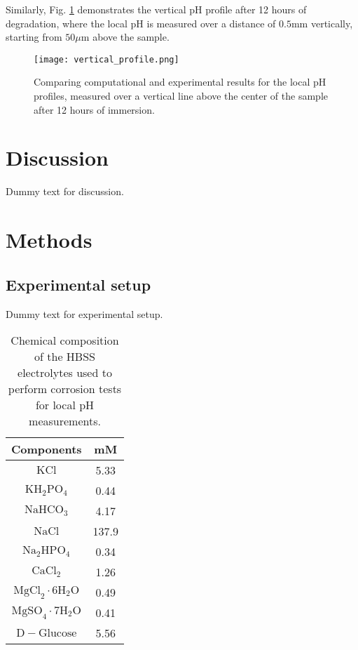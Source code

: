 Similarly, Fig. \ref{fig:kinetics_vertical_profile} demonstrates the vertical pH profile after 12 hours of degradation, where the local pH is measured over a distance of $0.5 \mathrm{mm}$ vertically, starting from $50 \mu\mathrm{m}$ above the sample.

\begin{figure}[h]
\centering
\medskip
\texttt{[image: vertical\_profile.png]}
\caption[Comparing computational and experimental vertical pH profiles]{Comparing computational and experimental results for the local pH profiles, measured over a vertical line above the center of the sample after 12 hours of immersion.} \label{fig:kinetics_vertical_profile}
\end{figure}

\section{Discussion}

Dummy text for discussion.

\section{Methods}

\subsection{Experimental setup}

Dummy text for experimental setup.

\begin{table}[h]
\caption[Chemical composition of the HBSS electrolyte]{Chemical composition of the HBSS electrolytes used to perform corrosion tests for local pH measurements.}
\medskip
\centering
\begin{tabular}{cc}
\hline
{Components} & {mM} \\
\hline
$\mathrm{KCl}$ & 5.33 \\
$\mathrm{KH}_{2} \mathrm{PO}_{4}$ & 0.44 \\
$\mathrm{NaHCO}_{3}$ & 4.17 \\
$\mathrm{NaCl}$ & 137.9 \\
$\mathrm{Na}_{2} \mathrm{HPO}_{4}$ & 0.34 \\
$\mathrm{CaCl}_{2}$ & 1.26 \\
$\mathrm{MgCl}_{2} \cdot 6 \mathrm{H}_{2} \mathrm{O}$ & 0.49 \\
$\mathrm{MgSO}_{4} \cdot 7 \mathrm{H}_{2} \mathrm{O}$ & 0.41 \\
$\mathrm{D}-\mathrm{Glucose}$ & 5.56 \\
\hline

\end{tabular}
\label{tab:kinetics_electrolyte_composition}
\end{table}


